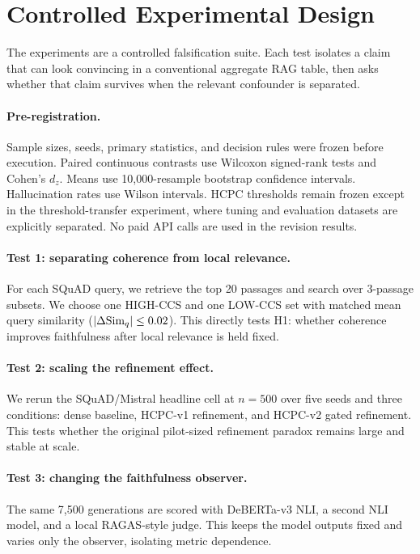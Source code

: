 \section{Controlled Experimental Design}

The experiments are a controlled falsification suite. Each test isolates a
claim that can look convincing in a conventional aggregate RAG table, then
asks whether that claim survives when the relevant confounder is separated.

\paragraph{Pre-registration.}
Sample sizes, seeds, primary statistics, and decision rules were frozen before
execution. Paired continuous contrasts use Wilcoxon signed-rank tests and
Cohen's $d_z$. Means use 10,000-resample bootstrap confidence intervals.
Hallucination rates use Wilson intervals. HCPC thresholds remain frozen except
in the threshold-transfer experiment, where tuning and evaluation datasets are
explicitly separated. No paid API calls are used in the revision results.

\paragraph{Test 1: separating coherence from local relevance.}
For each SQuAD query, we retrieve the top 20 passages and search over
3-passage subsets. We choose one HIGH-CCS and one LOW-CCS set with matched
mean query similarity ($|\Delta \mathrm{Sim}_{q}|\leq0.02$). This directly tests H1:
whether coherence improves faithfulness after local relevance is held fixed.

\paragraph{Test 2: scaling the refinement effect.}
We rerun the SQuAD/Mistral headline cell at $n=500$ over five seeds and three
conditions: dense baseline, HCPC-v1 refinement, and HCPC-v2 gated refinement.
This tests whether the original pilot-sized refinement paradox remains large
and stable at scale.

\paragraph{Test 3: changing the faithfulness observer.}
The same 7,500 generations are scored with DeBERTa-v3 NLI, a second NLI model,
and a local RAGAS-style judge. This keeps the model outputs fixed and varies
only the observer, isolating metric dependence.

